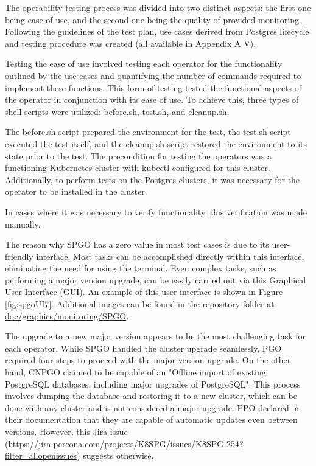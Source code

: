 \label{chap:operability}

The operability testing process was divided into two distinct aspects: the first one
being ease of use, and the second one being the quality of provided monitoring.
Following the guidelines of the test plan, use cases derived from Postgres lifecycle and testing procedure was created (all available in Appendix A V).

\label{chap:easeOfUse}
Testing the ease of use involved testing each operator for the functionality outlined by the use cases and quantifying the number of commands required to implement these functions.
This form of testing tested the functional aspects of the operator in conjunction with its ease of use.
To achieve this, three types of shell scripts were utilized: before.sh, test.sh, and cleanup.sh.

The before.sh script prepared the environment for the test, the test.sh script executed the test itself, and the cleanup.sh script restored the environment to its state prior to the test.
The precondition for testing the operators was a functioning Kubernetes cluster with kubectl configured for this cluster.
Additionally, to perform tests on the Postgres clusters, it was necessary for the operator to be installed in the cluster.

In cases where it was necessary to verify functionality, this verification was made manually.

The reason why SPGO has a zero value in most test cases is due to its user-friendly interface.
Most tasks can be accomplished directly within this interface, eliminating the need for using the terminal.
Even complex tasks, such as performing a major version upgrade, can be easily carried out via this Graphical User Interface (GUI).
An example of this user interface is shown in Figure \ref{fig:spgoUI7}.
Additional images can be found in the repository folder at \url{doc/graphics/monitoring/SPGO}.


The upgrade to a new major version appears to be the most challenging task for each operator. While SPGO handled the cluster upgrade seamlessly, PGO required four steps to proceed with the major version upgrade. On the other hand, CNPGO claimed to be capable of an "Offline import of existing PostgreSQL databases, including major upgrades of PostgreSQL". This process involves dumping the database and restoring it to a new cluster, which can be done with any cluster and is not considered a major upgrade. PPO declared in their documentation that they are capable of automatic updates even between versions. However, this Jira issue (\url{https://jira.percona.com/projects/K8SPG/issues/K8SPG-254?filter=allopenissues}) suggests otherwise.

